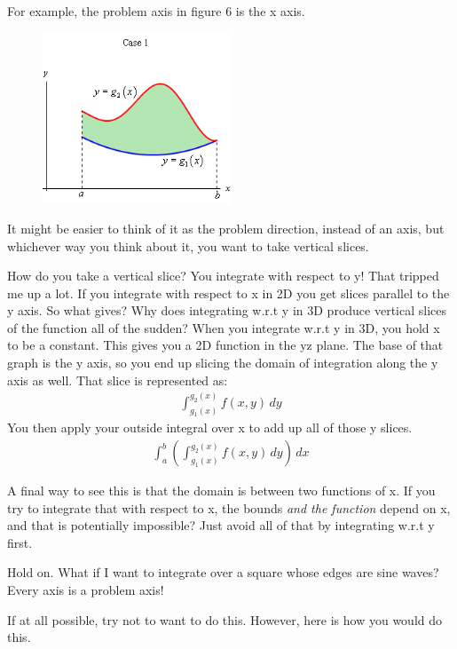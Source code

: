 \documentclass[12pt, letterpaper]{article}
\begin{document}
For example, the problem axis in figure 6 is the x axis.
\begin{figure}[h]
    \centering 
    \includegraphics[width=0.5\textwidth]{problemaxis}
    \caption{}
\end{figure}
It might be easier to think of it as the problem direction, instead of an axis, but whichever way you think about it, you want to take vertical slices.

How do you take a vertical slice? 
You integrate with respect to y!
That tripped me up a lot. If you integrate with respect to x in 2D you get slices parallel to the y axis.
So what gives? Why does integrating w.r.t y in 3D produce vertical slices of the function all of the sudden?
When you integrate w.r.t y in 3D, you hold x to be a constant. This gives you a 2D function in the yz plane.
The base of that graph is the y axis, so you end up slicing the domain of integration along the y axis as well.
That slice is represented as:
\begin{gather*}
    \int_{g_1(x)}^{g_2(x)} f(x, y) \,dy
\end{gather*}
You then apply your outside integral over x to add up all of those y slices.
\begin{gather*}
    \int_a^b\left(\int_{g_1(x)}^{g_2(x)} f(x, y) \,dy\right)\,dx
\end{gather*}

A final way to see this is that the domain is between two functions of x. 
If you try to integrate that with respect to x, the bounds \emph{and the function} depend on x, and that is potentially impossible?
Just avoid all of that by integrating w.r.t y first.

Hold on. What if I want to integrate over a square whose edges are sine waves?
Every axis is a problem axis!

If at all possible, try not to want to do this. However, here is how you would do this.
\end{document}
